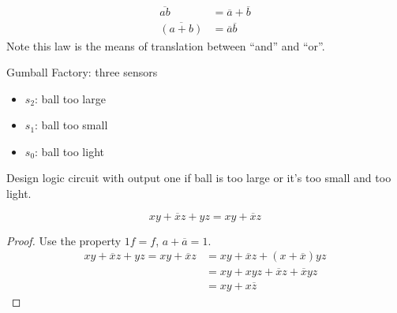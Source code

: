 \documentclass[a4paper, 10pt]{article}
\numberwithin{equation}{section}
\begin{document}
\begin{proposition}
    \begin{align}
        \overline{ab}&=\overline{a} + \overline{b}\\
        \overline{(a+b)}&=\overline{a}\overline{b}
    \end{align}
    Note this law is the means of translation between ``and'' and ``or''.
\end{proposition}
\begin{example}
    Gumball Factory: three sensors \begin{itemize}
        \item $s_2$: ball too large
        \item $s_1$: ball too small
        \item $s_0$: ball too light
    \end{itemize}
    \begin{center}
    \end{center}
    Design logic circuit with output one if ball is too large or it's too small and too light.
\end{example}

\begin{theorem}[Consensus]
    \begin{equation}
        xy+\overline{x}z+yz=xy+\overline{x}z
    \end{equation}
    \begin{proof}
        Use the property $1f=f$, $a+\overline{a}=1$.
        \begin{align}
            xy+\overline{x}z+yz=xy+\overline{x}z&=xy+\overline{x}z+(x+\overline{x})yz\\
            &=xy+xyz+\overline{x}z+\overline{x}yz\\
            &=xy+x\overline{z}
        \end{align}
    \end{proof}
\end{theorem}
\end{document}
